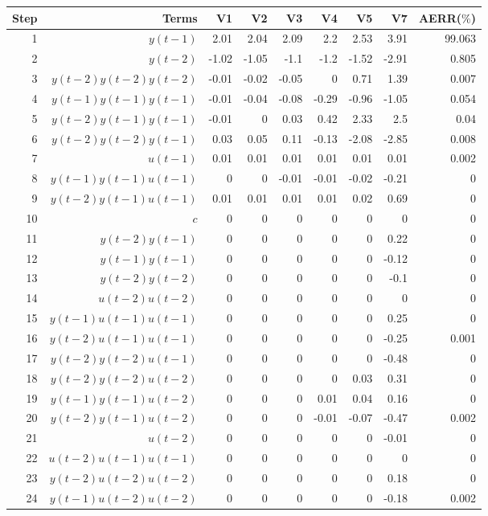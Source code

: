 \begin{tabular}{rrrrrrrrr}
Step & Terms & V1 & V2 & V3 & V4 & V5 & V7 & AERR($\%$) \\ 
\hline 
1 & $y(t-1)$ & 2.01 & 2.04 & 2.09 & 2.2 & 2.53 & 3.91 & 99.063 \\ 
2 & $y(t-2)$ & -1.02 & -1.05 & -1.1 & -1.2 & -1.52 & -2.91 & 0.805 \\ 
3 & $y(t-2)y(t-2)y(t-2)$ & -0.01 & -0.02 & -0.05 & 0 & 0.71 & 1.39 & 0.007 \\ 
4 & $y(t-1)y(t-1)y(t-1)$ & -0.01 & -0.04 & -0.08 & -0.29 & -0.96 & -1.05 & 0.054 \\ 
5 & $y(t-2)y(t-1)y(t-1)$ & -0.01 & 0 & 0.03 & 0.42 & 2.33 & 2.5 & 0.04 \\ 
6 & $y(t-2)y(t-2)y(t-1)$ & 0.03 & 0.05 & 0.11 & -0.13 & -2.08 & -2.85 & 0.008 \\ 
7 & $u(t-1)$ & 0.01 & 0.01 & 0.01 & 0.01 & 0.01 & 0.01 & 0.002 \\ 
8 & $y(t-1)y(t-1)u(t-1)$ & 0 & 0 & -0.01 & -0.01 & -0.02 & -0.21 & 0 \\ 
9 & $y(t-2)y(t-1)u(t-1)$ & 0.01 & 0.01 & 0.01 & 0.01 & 0.02 & 0.69 & 0 \\ 
10 & $c$ & 0 & 0 & 0 & 0 & 0 & 0 & 0 \\ 
11 & $y(t-2)y(t-1)$ & 0 & 0 & 0 & 0 & 0 & 0.22 & 0 \\ 
12 & $y(t-1)y(t-1)$ & 0 & 0 & 0 & 0 & 0 & -0.12 & 0 \\ 
13 & $y(t-2)y(t-2)$ & 0 & 0 & 0 & 0 & 0 & -0.1 & 0 \\ 
14 & $u(t-2)u(t-2)$ & 0 & 0 & 0 & 0 & 0 & 0 & 0 \\ 
15 & $y(t-1)u(t-1)u(t-1)$ & 0 & 0 & 0 & 0 & 0 & 0.25 & 0 \\ 
16 & $y(t-2)u(t-1)u(t-1)$ & 0 & 0 & 0 & 0 & 0 & -0.25 & 0.001 \\ 
17 & $y(t-2)y(t-2)u(t-1)$ & 0 & 0 & 0 & 0 & 0 & -0.48 & 0 \\ 
18 & $y(t-2)y(t-2)u(t-2)$ & 0 & 0 & 0 & 0 & 0.03 & 0.31 & 0 \\ 
19 & $y(t-1)y(t-1)u(t-2)$ & 0 & 0 & 0 & 0.01 & 0.04 & 0.16 & 0 \\ 
20 & $y(t-2)y(t-1)u(t-2)$ & 0 & 0 & 0 & -0.01 & -0.07 & -0.47 & 0.002 \\ 
21 & $u(t-2)$ & 0 & 0 & 0 & 0 & 0 & -0.01 & 0 \\ 
22 & $u(t-2)u(t-1)u(t-1)$ & 0 & 0 & 0 & 0 & 0 & 0 & 0 \\ 
23 & $y(t-2)u(t-2)u(t-2)$ & 0 & 0 & 0 & 0 & 0 & 0.18 & 0 \\ 
24 & $y(t-1)u(t-2)u(t-2)$ & 0 & 0 & 0 & 0 & 0 & -0.18 & 0.002 \\ 
\hline 
\end{tabular}